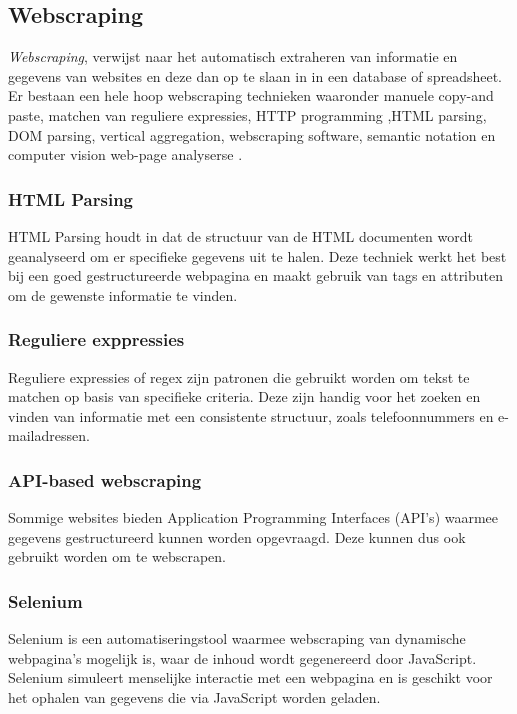 \subsection{Webscraping}

\textit{Webscraping}, verwijst naar het automatisch extraheren van informatie en gegevens van websites en deze dan op te slaan in 
in een database of spreadsheet.
Er bestaan een hele hoop webscraping technieken waaronder manuele copy-and paste, matchen van reguliere expressies, HTTP programming
,HTML parsing, DOM parsing, vertical aggregation, webscraping software, semantic notation en computer vision web-page analyserse
\autocite{DeSSirisuriya2015}.

\subsubsection{HTML Parsing}
HTML Parsing houdt in dat de structuur van de HTML documenten wordt geanalyseerd om er specifieke gegevens uit te halen.
Deze techniek werkt het best bij een goed gestructureerde webpagina en maakt gebruik van tags en attributen om de gewenste informatie
te vinden.

\subsubsection{Reguliere exppressies}
Reguliere expressies of regex zijn patronen die gebruikt worden om tekst te matchen op basis van specifieke criteria.
Deze zijn handig voor het zoeken en vinden van informatie met een consistente structuur, zoals telefoonnummers en e-mailadressen.

\subsubsection{API-based webscraping}
Sommige websites bieden Application Programming Interfaces (API's) waarmee gegevens gestructureerd kunnen worden opgevraagd. 
Deze kunnen dus ook gebruikt worden om te webscrapen.

\subsubsection{Selenium}
Selenium is een automatiseringstool waarmee webscraping van dynamische webpagina's mogelijk is, 
waar de inhoud wordt gegenereerd door JavaScript. Selenium simuleert menselijke interactie met een webpagina en is geschikt voor het ophalen van gegevens die via JavaScript worden geladen.

